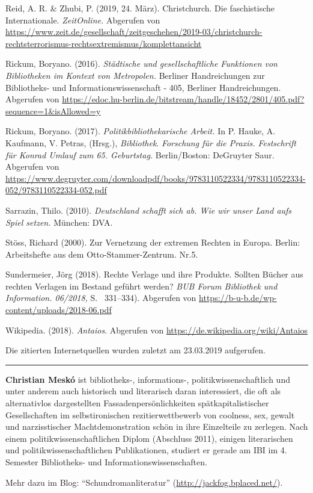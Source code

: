 \documentclass[a4paper,
fontsize=11pt,
oneside,
numbers=noperiodatend,
parskip=half-,
bibliography=totoc,
final
]{scrartcl}
\begin{document}
Reid, A. R. \& Zhubi, P. (2019, 24. März). Christchurch. Die
faschistische Internationale. \emph{ZeitOnline.} Abgerufen von
\url{https://www.zeit.de/gesellschaft/zeitgeschehen/2019-03/christchurch-rechtsterrorismus-rechtsextremismus/komplettansicht}

Rickum, Boryano. (2016). \emph{Städtische und gesellschaftliche
Funktionen von Bibliotheken im Kontext von Metropolen.} Berliner
Handreichungen zur Bibliotheks- und Informationswissenschaft - 405,
Berliner Handreichungen. Abgerufen von
\url{https://edoc.hu-berlin.de/bitstream/handle/18452/2801/405.pdf?sequence=1\&isAllowed=y}

Rickum, Boryano. (2017). \emph{Politikbibliothekarische Arbeit.} In P.
Hauke, A. Kaufmann, V. Petras, (Hrsg.), \emph{Bibliothek}.
\emph{Forschung für die Praxis. Festschrift für Konrad Umlauf zum 65.
Geburtstag.} Berlin/Boston: DeGruyter Saur. Abgerufen von
\url{https://www.degruyter.com/downloadpdf/books/9783110522334/9783110522334-052/9783110522334-052.pdf}

Sarrazin, Thilo. (2010). \emph{Deutschland schafft sich ab. Wie wir
unser Land aufs Spiel setzen.} München: DVA.

Stöss, Richard (2000). Zur Vernetzung der extremen Rechten in Europa.
Berlin: Arbeitshefte aus dem Otto-Stammer-Zentrum. Nr.5.

Sundermeier, Jörg (2018). Rechte Verlage und ihre Produkte. Sollten
Bücher aus rechten Verlagen im Bestand geführt werden? \emph{BUB Forum
Bibliothek und Information. 06/2018,} S. ~331--334). Abgerufen von
\url{https://b-u-b.de/wp-content/uploads/2018-06.pdf}

Wikipedia. (2018). \emph{Antaios}. Abgerufen von
\url{https://de.wikipedia.org/wiki/Antaios}

Die zitierten Internetquellen wurden zuletzt am 23.03.2019 aufgerufen.

\begin{center}\rule{0.5\linewidth}{\linethickness}\end{center}

\textbf{Christian Meskó} ist bibliotheks-, informations-,
politikwissenschaftlich und unter anderem auch historisch und
literarisch daran interessiert, die oft als alternativlos dargestellten
Fassadenpersönlichkeiten spätkapitalistischer Gesellschaften im
selbstironischen rezitierwettbewerb von coolness, sex, gewalt und
narzisstischer Machtdemonstration schön in ihre Einzelteile zu zerlegen.
Nach einem politikwissenschaftlichen Diplom (Abschluss 2011), einigen
literarischen und politikwissenschaftlichen Publikationen, studiert er
gerade am IBI im 4. Semester Bibliotheks- und
Informationswissenschaften.

Mehr dazu im Blog: ``Schundromanliteratur''
(\url{http://jackfog.bplaced.net/}).
\end{document}
